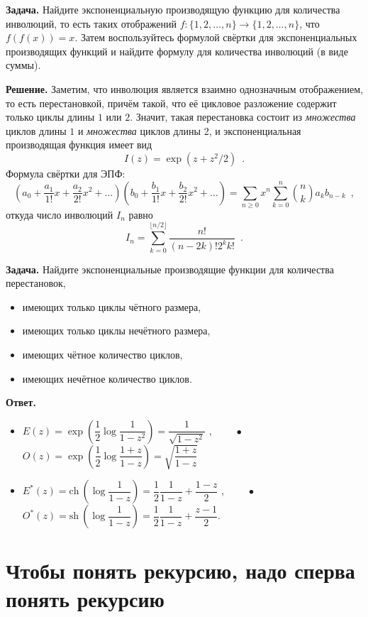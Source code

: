 \documentclass{article}
\theoremstyle{definition}
\begin{document}
\textbf{Задача.} Найдите экспоненциальную производящую функцию для количества 
инволюций, то есть таких отображений \( f \colon \{ 1, 2, \ldots, n \} \to \{ 
1, 2, \ldots, n \} \), что \( f(f(x)) = x \). Затем воспользуйтесь формулой 
свёртки для экспоненциальных производящих функций и найдите формулу для 
количества инволюций (в виде суммы).

\textbf{Решение.} Заметим, что инволюция является взаимно однозначным 
отображением, то есть перестановкой, причём такой, что её цикловое разложение 
содержит только циклы длины \( 1 \) или \( 2 \). Значит, такая перестановка 
состоит из \textit{множества} циклов длины \( 1 \) и \textit{множества} циклов 
длины 2, и экспоненциальная производящая функция имеет вид
\[
	I(z) = \exp \left(
		z + z^2/2
	\right) \enspace .
\]
Формула свёртки для ЭПФ:
\[
	\left(a_0 + \dfrac{a_1}{1!}x + \dfrac{a_2}{2!}x^2 + \ldots\right)
	\left(b_0 + \dfrac{b_1}{1!}x + \dfrac{b_2}{2!}x^2 + \ldots\right)	
= \sum_{n \geq 0} x^n \sum_{k = 0}^{n}{n \choose k} a_{k} b_{n-k} \enspace ,
\]
откуда число инволюций \( I_n \) равно
\[
	I_n = \sum_{k=0}^{\lfloor n/2 \rfloor}\dfrac{n!}{(n-2k)!2^k k!} \enspace .
\]

\textbf{Задача.} Найдите экспоненциальные производящие функции для количества 
перестановок,
\begin{itemize}
	\item имеющих только циклы чётного размера,
	\item имеющих только циклы нечётного размера,
	\item имеющих чётное количество циклов,
	\item имеющих нечётное количество циклов.
\end{itemize}

\textbf{Ответ.}

\begin{itemize}
	\item \( E(z) = \exp\left(\dfrac12 \log \dfrac{1}{1-z^2}\right) = 
	\dfrac{1}{\sqrt{1 - z^2}} \) , 
	\( \qquad \bullet \) \( O(z) = \exp\left(\dfrac12 \log 
	\dfrac{1+z}{1-z}\right) = 
	\sqrt{\dfrac{1+z}{1-z}} \)
	\item \( E^{*}(z) = \mathrm{ch}\ \left(\log \dfrac{1}{1 - z}\right) = 
	\dfrac12 \dfrac{1}{1 - z} + \dfrac{1 - z}{2} \) , \( \qquad \bullet \)
	\( O^{*}(z) = \mathrm{sh}\ \left( \log \dfrac{1}{1 - z}\right) = 
	\dfrac12\dfrac{1}{1 - z} + \dfrac{z - 1}{2} \).
\end{itemize}

\section{Чтобы понять рекурсию, надо сперва понять рекурсию}
\end{document}
